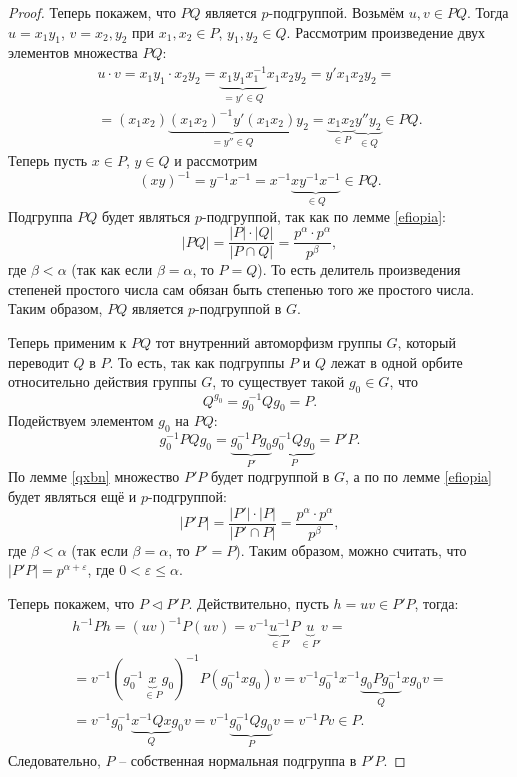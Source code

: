 \documentclass{article}
\begin{document}
\begin{proof}
    Теперь покажем, что $PQ$ является $p$-подгруппой. Возьмём $u,v \in PQ$. Тогда $u = x_1y_1$, $v = x_2, y_2$ при $x_1, x_2 \in P$, $y_1, y_2 \in Q$. Рассмотрим произведение двух элементов множества $PQ$: 
    \begin{multline*}
        u \cdot v = x_1y_1 \cdot x_2 y_2 = \underbrace{x_1 y_1 x_1^{-1}}_{ = y' \in Q} x_1 x_2 y_2 = y' x_1 x_2 y_2 = \\
        = (x_1 x_2) \underbrace{(x_1 x_2)^{-1} y' (x_1 x_2)}_{ = y'' \in Q} y_2 = \underbrace{x_1 x_2}_{\in P} \underbrace{y'' y_2}_{\in Q} \in PQ.
    \end{multline*}
    Теперь пусть $x \in P$, $y \in Q$ и рассмотрим $$ (xy)^{-1} = y^{-1} x^{-1} = x^{-1} \underbrace{x y^{-1} x^{-1}}_{\in Q} \in PQ. $$
    Подгруппа $PQ$ будет являться $p$-подгруппой, так как по лемме \ref{efiopia}: $$ |PQ| = \frac{|P| \cdot |Q|}{|P \cap Q|} = \frac{p^\alpha \cdot p^\alpha}{p^\beta}, $$ где $\beta < \alpha$ (так как если $\beta = \alpha$, то $P = Q$). То есть делитель произведения степеней простого числа сам обязан быть степенью того же простого числа. Таким образом, $PQ$ является $p$-подгруппой в $G$.

    Теперь применим к $PQ$ тот внутренний автоморфизм группы $G$, который переводит $Q$ в $P$. То есть, так как подгруппы $P$ и $Q$ лежат в одной орбите относительно действия группы $G$, то существует такой $g_0 \in G$, что $$ Q^{g_0} = g_0^{-1} Q g_0 = P. $$
    Подействуем элементом $g_0$ на $PQ$: $$ g_0^{-1} PQ g_0 = \underbrace{g_0^{-1} P g_0}_{P'} \underbrace{g_0^{-1} Q g_0}_{P} = P' P. $$ По лемме \ref{qxbn} множество $P'P$ будет подгруппой в $G$, а по по лемме \ref{efiopia} будет являться ещё и $p$-подгруппой: $$ |P'P| = \frac{|P'|\cdot |P|}{|P' \cap P|} = \frac{p^\alpha \cdot p^\alpha}{p^\beta}, $$ где $\beta < \alpha$ (так если $\beta = \alpha$, то $P' = P$). Таким образом, можно считать, что $|P'P| = p^{\alpha + \varepsilon}$, где $0 < \varepsilon \leqslant \alpha$.
    
    Теперь покажем, что $ P \triangleleft P'P $. Действительно, пусть $h = uv \in P'P$, тогда:
    \begin{multline*}
        h^{-1} P h = (uv)^{-1} P (uv) = v^{-1} \underbrace{u^{-1}}_{\in P'} P \underbrace{u}_{\in P'} v = \\ 
        = v^{-1} (g_0^{-1} \underbrace{x}_{\in P} g_0)^{-1} P (g_0^{-1} x g_0) v = v^{-1} g_0^{-1} x^{-1} \underbrace{g_0  P g_0^{-1}}_{ Q} x g_0 v = \\
        = v^{-1} g_0^{-1} \underbrace{x^{-1} Q x}_{ Q} g_0 v = v^{-1} \underbrace{g_0^{-1} Q g_0}_{ P} v = v^{-1} P v \in P.
    \end{multline*}
    Следовательно, $P$ -- собственная нормальная подгруппа в $P'P$.


\end{proof}
\end{document}
